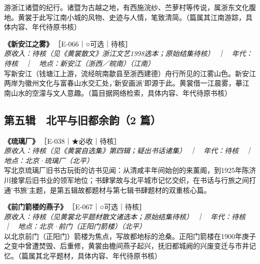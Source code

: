 \documentclass[UTF8,fontset=none,zihao=-4,a4paper]{ctexart}
\begin{document}
游浙江诸暨的纪行。诸暨为古越之地，有西施浣纱、苎萝村等传说，属浙东文化腹地。黄裳于此写江南小城的风物、史迹与人情，笔致清简。（篇属其江南游踪，具体内容、年代待原书核）
\par\vspace{5pt}
\noindent\textbf{《新安江之雾》}\,{\small ［E-066｜○可选｜待核］}\\
{\small\itshape 原收入：待核（见《黄裳散文》浙江文艺1998选本；原始结集待核）　｜　年代：待核　｜　地点：新安江（浙西／皖南）（江南）}\\
写新安江（钱塘江上游，流经皖南歙县至浙西建德）舟行所见的江雾山色。新安江两岸为徽州文化与富春山水交汇处，'新安画派'即源于此。黄裳借一江晨雾，摹江南山水的空濛与文人意趣。（篇目据网络检索，具体内容、年代待原书核）
\par\vspace{5pt}
\subsection{第五辑　北平与旧都余韵（2 篇）}
\noindent\textbf{《琉璃厂》}\,{\small ［E-038｜★必收｜待核］}\\
{\small\itshape 原收入：待核（见《黄裳自选集》第四辑；疑出书话诸集）　｜　年代：待核　｜　地点：北京·琉璃厂（北平）}\\
写北京琉璃厂旧书古玩街的访书见闻：从清咸丰年间始创的来薰阁，到1925年陈济川接掌后旧书业的领军地位；书肆掌故与北平城市记忆交织，在书话与行旅之间打通'书旅'主题，是第五辑故都题材与第七辑书肆题材的双重核心篇。
\par\vspace{5pt}
\noindent\textbf{《前门箭楼的燕子》}\,{\small ［E-067｜○可选｜待核］}\\
{\small\itshape 原收入：待核（见黄裳北平题材散文诸选本；原始结集待核）　｜　年代：待核　｜　地点：北京·前门（正阳门箭楼）（北平）}\\
以北京前门（正阳门）箭楼为焦点，写故都地标的沧桑。正阳门箭楼在1900年庚子之变中曾遭焚毁、后重修，黄裳由檐间燕子起兴，抚旧都城阙的兴废变迁与市井记忆。（篇属其北平题材，具体内容、年代待原书核）
\par\vspace{5pt}
\end{document}
